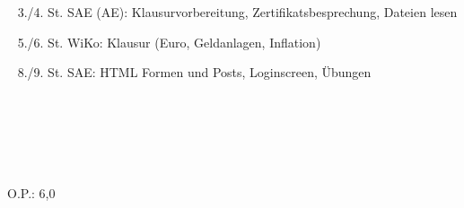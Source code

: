 {{	\textbullet~ 3./4. St. SAE (AE): Klausurvorbereitung, Zertifikatsbesprechung, Dateien lesen\par
	\textbullet~ 5./6. St. WiKo: Klausur (Euro, Geldanlagen, Inflation)\par
	\textbullet~ 8./9. St. SAE: HTML Formen und Posts, Loginscreen, Übungen\par
	\textbullet~ \par
	\textbullet~ \par
	\textbullet~ 
	}{}{O.P.: 6,0}
}{}
\Unterschrift
\newpage
